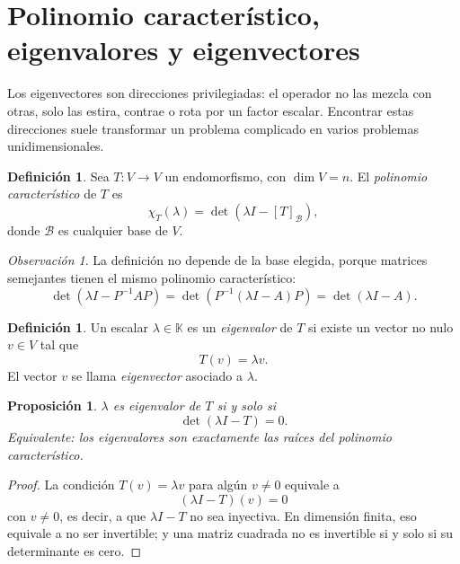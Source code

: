 \documentclass[10pt,a4paper,oneside]{article}
\theoremstyle{plain}
\newtheorem{proposition}[theorem]{Proposición}
\theoremstyle{definition}
\newtheorem{definition}[theorem]{Definición}
\theoremstyle{remark}
\newtheorem{remark}[theorem]{Observación}
\newcommand{\K}{\mathbb{K}}
\newcommand{\charpol}{\chi}
\begin{document}
\section{Polinomio característico, eigenvalores y eigenvectores}
\begin{ideaBox}
Los eigenvectores son direcciones privilegiadas: el operador no las mezcla con otras, solo las estira, contrae o rota por un factor escalar. Encontrar estas direcciones suele transformar un problema complicado en varios problemas unidimensionales.
\end{ideaBox}
\begin{definition}
Sea \(T:V\to V\) un endomorfismo, con \(\dim V=n\). El \emph{polinomio característico} de \(T\) es
\[
\charpol_T(\lambda)=\det(\lambda I-[T]_{\mathcal{B}}),
\]
donde \(\mathcal{B}\) es cualquier base de \(V\).
\end{definition}

\begin{remark}
La definición no depende de la base elegida, porque matrices semejantes tienen el mismo polinomio característico:
\[
\det(\lambda I-P^{-1}AP)=\det(P^{-1}(\lambda I-A)P)=\det(\lambda I-A).
\]
\end{remark}

\begin{definition}
Un escalar \(\lambda\in\K\) es un \emph{eigenvalor} de \(T\) si existe un vector no nulo \(v\in V\) tal que
\[
T(v)=\lambda v.
\]
El vector \(v\) se llama \emph{eigenvector} asociado a \(\lambda\).
\end{definition}

\begin{proposition}
\(\lambda\) es eigenvalor de \(T\) si y solo si
\[
\det(\lambda I-T)=0.
\]
Equivalente: los eigenvalores son exactamente las raíces del polinomio característico.
\end{proposition}

\begin{proof}
La condición \(T(v)=\lambda v\) para algún \(v\neq 0\) equivale a
\[
(\lambda I-T)(v)=0
\]
con \(v\neq 0\), es decir, a que \(\lambda I-T\) no sea inyectiva. En dimensión finita, eso equivale a no ser invertible; y una matriz cuadrada no es invertible si y solo si su determinante es cero. \end{proof}
\end{document}
